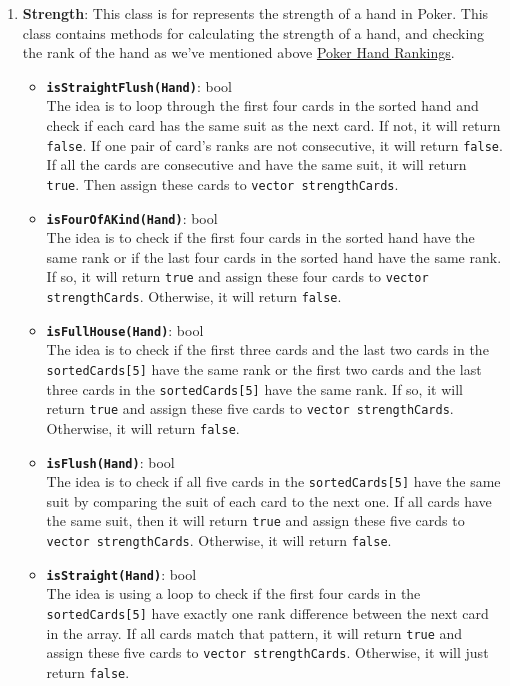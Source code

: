 \begin{enumerate}
    \item \textbf{Strength}: This class is for represents the strength of a hand in Poker. This class contains methods for calculating the strength of a hand, and checking the rank of the hand as we've mentioned above \hyperref[subsubsec:poker-hand-rankings]{Poker Hand Rankings}.
    \begin{itemize}
        \item \texttt{\textbf{isStraightFlush(Hand)}}: bool \\ The idea is to loop through the first four cards in the sorted hand and check if each card has the same suit as the next card. If not, it will return \texttt{false}. If one pair of card's ranks are not consecutive, it will return \texttt{false}. If all the cards are consecutive and have the same suit, it will return \texttt{true}. Then assign these cards to \texttt{vector strengthCards}.
        \item \texttt{\textbf{isFourOfAKind(Hand)}}: bool \\ The idea is to check if the first four cards in the sorted hand have the same rank or if the last four cards in the sorted hand have the same rank. If so, it will return \texttt{true} and assign these four cards to \texttt{vector strengthCards}. Otherwise, it will return \texttt{false}.
        \item \texttt{\textbf{isFullHouse(Hand)}}: bool \\ The idea is to check if the first three cards and the last two cards in the \texttt{sortedCards[5]} have the same rank or the first two cards and the last three cards in the \texttt{sortedCards[5]} have the same rank. If so, it will return \texttt{true} and assign these five cards to \texttt{vector strengthCards}. Otherwise, it will return \texttt{false}.
        \item \texttt{\textbf{isFlush(Hand)}}: bool \\ The idea is to check if all five cards in the \texttt{sortedCards[5]} have the same suit by comparing the suit of each card to the next one. If all cards have the same suit, then it will return \texttt{true} and assign these five cards to \texttt{vector strengthCards}. Otherwise, it will return \texttt{false}.
        \item \texttt{\textbf{isStraight(Hand)}}: bool \\ The idea is using a loop to check if the first four cards in the \texttt{sortedCards[5]} have exactly one rank difference between the next card in the array. If all cards match that pattern, it will return \texttt{true} and assign these five cards to \texttt{vector strengthCards}. Otherwise, it will just return \texttt{false}.

\end{itemize}
\end{enumerate}
